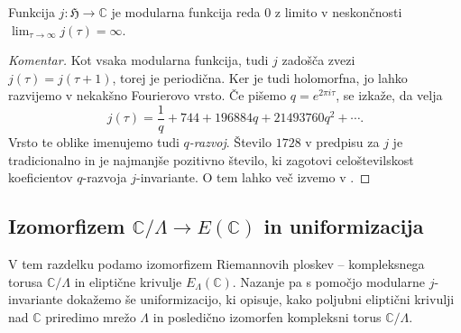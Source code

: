 \documentclass[mat1]{fmfdelo}
\numberwithin{equation}{section}
\newcommand{\C}{\mathbb C}
\newcommand{\HH}{\mathfrak{H}}
\newcommand{\Lattice}{\mathscr{L}}
\newcommand{\CM}{\mathbb C ^*}
\newcommand{\om}{\omega}
\newcommand{\inv}{^{-1}}
\newcommand{\torus}{\C/\Lambda}
\newcommand{\htp}{\simeq}
\renewcommand\Im{\operatorname{Im}}%
\theoremstyle{definition}
\newenvironment{komentar}[1][Komentar]{\begin{proof}[#1]\let\qed\relax}{\end{proof}}
\begin{document}
\begin{trditev}
    Funkcija $j : \HH \to \C$ je modularna funkcija reda $0$ z limito v neskončnosti $\lim_{\tau \to \infty}j(\tau) = \infty$.
\end{trditev}

\begin{komentar}
    Kot vsaka modularna funkcija, tudi $j$ zadošča zvezi $j(\tau) = j(\tau + 1)$, torej je periodična. Ker je tudi holomorfna, jo lahko razvijemo v nekakšno Fourierovo vrsto. Če pišemo $q = e^{2\pi i \tau}$, se izkaže, da velja
    \[
        j(\tau) = \frac{1}{q} + 744 + 196884q + 21493760q^2 + \cdots.
    \]
    Vrsto te oblike imenujemo tudi \emph{$q$-razvoj}. Število $1728$ v predpisu za $j$ je tradicionalno in je najmanjše pozitivno število, ki zagotovi celoštevilskost koeficientov $q$-razvoja $j$-invariante. O tem lahko več izvemo v \cite[VII, \S3]{Serre}.
\end{komentar}





\subsection{Izomorfizem \texorpdfstring{$\C/\Lambda \to E(\C)$ in uniformizacija}{}} 

V tem razdelku podamo izomorfizem Riemannovih ploskev -- kompleksnega torusa $\torus$ in eliptične krivulje $E_\Lambda(\C)$. Nazanje pa s pomočjo modularne $j$-invariante dokažemo še uniformizacijo, ki opisuje, kako poljubni eliptični krivulji nad $\C$ priredimo mrežo $\Lambda$ in posledično izomorfen kompleksni torus $\torus$.
\end{document}
